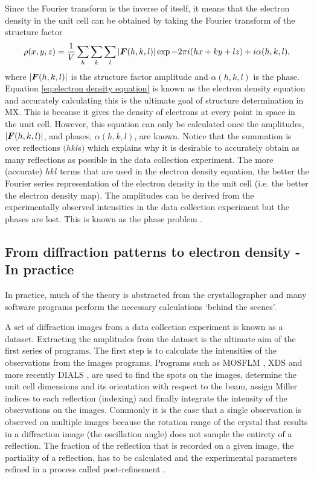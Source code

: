         Since the Fourier transform is the inverse of itself, it means that the electron density in the unit cell can be obtained by taking the Fourier transform of the structure factor
        \begin{equation}
            \rho(x,y,z) = \frac{1}{V} \sum_h \sum_k \sum_l |\boldsymbol{F}(h,k,l)| \exp{-2\pi i (hx + ky + lz) + i \alpha(h,k,l)},
            \label{eq:electron density equation}
        \end{equation}
        where $|\boldsymbol{F}(h,k,l)|$ is the structure factor amplitude and $\alpha(h,k,l)$ is the phase. Equation \ref{eq:electron density equation} is known as the electron density equation and accurately calculating this is the ultimate goal of structure determination in MX.
        This is because it gives the density of electrons at every point in space in the unit cell.
        However, this equation can only be calculated once the amplitudes, $|\boldsymbol{F}(h,k,l)|$, and phases, $\alpha(h,k,l)$, are known.
        Notice that the summation is over reflections $(hkl$s$)$ which explains why it is desirable to accurately obtain as many reflections as possible in the data collection experiment.
        The more (accurate) $hkl$ terms that are used in the electron density equation, the better the Fourier series representation of the electron density in the unit cell (i.e. the better the electron density map).
        The amplitudes can be derived from the experimentally observed intensities in the data collection experiment but the phases are lost. This is known as the phase problem \cite{taylor2010}.

    \subsection{From diffraction patterns to electron density - In practice}
    \label{sub:From diffraction patterns to electron density - In practice}
        In practice, much of the theory is abstracted from the crystallographer and many software programs perform the necessary calculations `behind the scenes'.

        A set of diffraction images from a data collection experiment is known as a dataset. Extracting the amplitudes from the dataset is the ultimate aim of the first series of programs.
        The first step is to calculate the intensities of the observations from the images programs.
        Programs such as MOSFLM \cite{leslie2007}, XDS \cite{kabsch2010} and more recently DIALS \cite{waterman2013dials,waterman2016diffraction}, are used to find the spots on the images, determine the unit cell dimensions and its orientation with respect to the beam, assign Miller indices to each reflection (indexing) and finally integrate the intensity of the observations on the images.
        Commonly it is the case that a single observation is observed on multiple images because the rotation range of the crystal that results in a diffraction image (the oscillation angle) does not sample the entirety of a reflection.
        The fraction of the reflection that is recorded on a given image, the partiality of a reflection, has to be calculated and the experimental parameters refined in a process called post-refinement \cite{rossmann1979processing, rossmann1979oscillation}.

